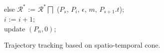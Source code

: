 \begin{figure}[tb!]
\begin{center}
{\begin{minipage}{3.3in}
{						\icc \>\hspace{3ex} else $\mathcal{R}^*$ := $\mathcal{R}^*\bigsqcap$ ($P_s$, $P_{i}$, $\epsilon$, $m$, $P_{s+1}.t$); \\
						\icc \>\hspace{3ex} $i$ := $i +1$;	\\
						\icc \>\hspace{0ex} update $(P_{n}, 0)$; 
					}
					\vspace{-2ex}
					\myhrule
				\end{minipage}
			}
		\end{center}
		\vspace{-1ex}
		\caption{\small Trajectory tracking based on spatio-temporal cone.}
		\label{alg:citt-s-full}
		\vspace{-1ex}
	\end{figure}

